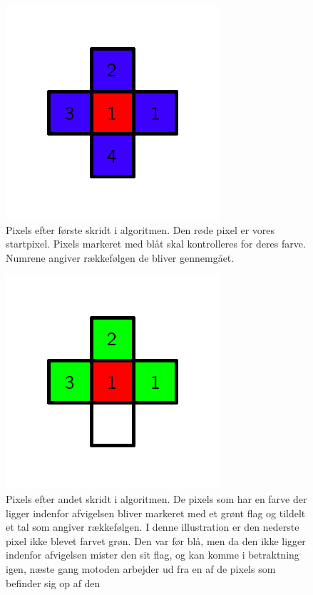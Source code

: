 {\begin{figure}[!h]
    \begin{center}
        \includegraphics[scale=0.42,angle=0]{afsnit/vores_implementation/billeder/flood_fill/floodfill2}
    \end{center}
    \caption[]{Pixels efter første skridt i algoritmen. Den røde pixel
    er vores startpixel. Pixels markeret med blåt skal kontrolleres for
    deres farve. Numrene angiver rækkefølgen de bliver gennemgået.}
    \label{floodfill2}
\end{figure}

\begin{figure}[!h]
    \begin{center}
        \includegraphics[scale=0.42,angle=0]{afsnit/vores_implementation/billeder/flood_fill/floodfill3}
    \end{center}
    \caption[]{Pixels efter andet skridt i algoritmen. De pixels som har
    en farve der ligger indenfor afvigelsen bliver markeret med et grønt
    flag og tildelt et tal som angiver rækkefølgen. I denne illustration
    er den nederste pixel ikke blevet farvet grøn. Den var før blå, men
    da den ikke ligger indenfor afvigelsen mister den sit flag, og kan
    komme i betraktning igen, næste gang motoden arbejder ud fra en af
    de pixels som befinder sig op af den}
    \label{floodfill3}
\end{figure}

}
